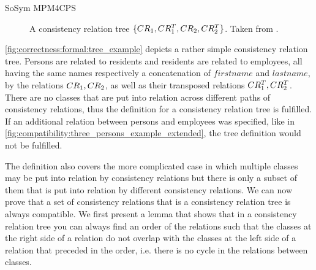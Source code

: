 \begin{copiedFrom}{SoSym MPM4CPS}
\begin{figure}
    \centering
    
    \caption[A consistency relation tree]{A consistency relation tree $\{ CR_{1}, CR^T_{1}, CR_{2}, CR^T_{2} \}$. Taken from .}
    \label{fig:correctness:formal:tree_example}
\end{figure}

\begin{example}
\autoref{fig:correctness:formal:tree_example} depicts a rather simple consistency relation tree. 
Persons are related to residents and residents are related to employees, all having the same names respectively a concatenation of $firstname$ and $lastname$, by the relations $CR_{1}, CR_{2}$, as well as their transposed relations $CR^T_{1}, CR^T_{2}$.
There are no classes that are put into relation across different paths of consistency relations, thus the definition for a consistency relation tree is fulfilled. 
If an additional relation between persons and employees was specified, like in \autoref{fig:compatibility:three_persons_example_extended}, the tree definition would not be fulfilled.
\end{example}

The definition also covers the more complicated case in which multiple classes may be put into relation by consistency relations but there is only a subset of them that is put into relation by different consistency relations.
%
%
We can now prove that a set of consistency relations that is a consistency relation tree is always compatible.
We first present a lemma that shows that in a consistency relation tree you can always find an order of the relations such that the classes at the right side of a relation do not overlap with the classes at the left side of a relation that preceded in the order, i.e. there is no cycle in the relations between classes.


\end{copiedFrom}
